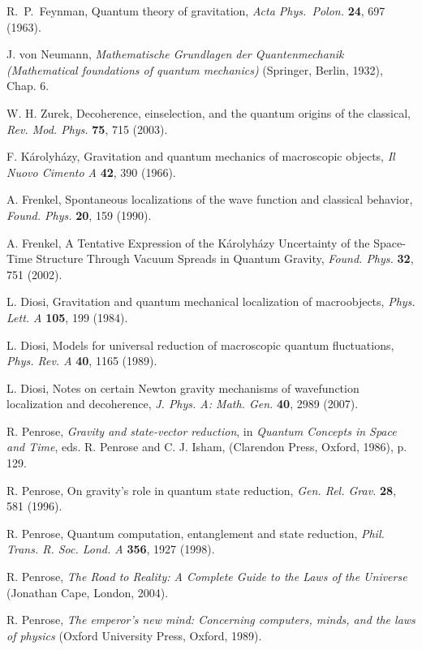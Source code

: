 \documentclass{ws-procs961x669}            %
\begin{document}
\begin{thebibliography}{10}
R.~P.~Feynman, Quantum theory of gravitation, {\em Acta Phys.\ Polon.} {\bf 24}, 697 (1963).

J. von Neumann, {\em Mathematische Grundlagen der Quantenmechanik
(Mathematical foundations of quantum mechanics)} (Springer, Berlin, 1932), Chap. 6.

W. H. Zurek, Decoherence, einselection, and the quantum origins of the classical, {\em Rev. Mod. Phys.} {\bf 75}, 715 (2003).

F. K\'arolyh\'azy, Gravitation and quantum mechanics of
macroscopic objects, {\em Il Nuovo Cimento A} {\bf 42}, 390 (1966).

A. Frenkel, Spontaneous localizations of the wave function
and classical behavior, {\em Found. Phys.} {\bf 20}, 159 (1990).

A. Frenkel, A Tentative Expression of the K\'arolyh\'azy
Uncertainty of the Space-Time Structure Through Vacuum Spreads in
Quantum Gravity, {\em Found. Phys.} {\bf 32}, 751 (2002).

L. Diosi, Gravitation and quantum mechanical localization of
macroobjects, {\em Phys. Lett. A} {\bf 105}, 199 (1984).

L. Diosi, Models for universal reduction of macroscopic
quantum fluctuations, {\em Phys. Rev. A} {\bf 40}, 1165 (1989).

L. Diosi, Notes on certain Newton gravity mechanisms of
wavefunction localization and decoherence, {\em J. Phys. A: Math. Gen.}
{\bf 40}, 2989 (2007).

R. Penrose, {\em Gravity and state-vector reduction}, in {\em Quantum Concepts in Space
and Time}, eds. R. Penrose and C. J. Isham, (Clarendon Press, Oxford, 1986), p. 129.

R. Penrose, On gravity's role in quantum state reduction,
{\em Gen. Rel. Grav.} {\bf 28}, 581 (1996).

R. Penrose, Quantum computation, entanglement and state
reduction, {\em Phil. Trans. R. Soc. Lond. A} {\bf 356}, 1927 (1998).

R. Penrose, {\em The Road to Reality: A Complete Guide to the
Laws of the Universe} (Jonathan Cape, London, 2004).

R. Penrose, {\em The emperor's new mind: Concerning computers, minds, and the laws of physics} (Oxford University Press, Oxford, 1989).


\end{thebibliography}
\end{document}
